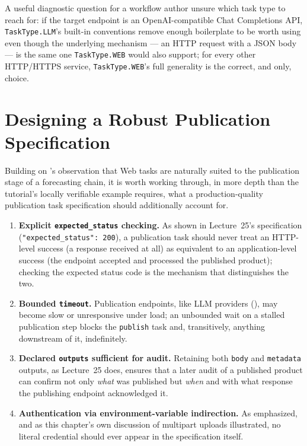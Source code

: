 \begin{practicebox}
A useful diagnostic question for a workflow author unsure which task type to
reach for: if the target endpoint is an OpenAI-compatible Chat Completions
API, \texttt{TaskType.LLM}'s built-in conventions remove enough boilerplate
to be worth using even though the underlying mechanism --- an HTTP request
with a JSON body --- is the same one \texttt{TaskType.WEB} would also
support; for every other HTTP/HTTPS service, \texttt{TaskType.WEB}'s full
generality is the correct, and only, choice.
\end{practicebox}

\section{Designing a Robust Publication Specification}

Building on 's observation that Web tasks are naturally
suited to the publication stage of a forecasting chain, it is worth working
through, in more depth than the tutorial's locally verifiable example
requires, what a production-quality publication task specification should
additionally account for.

\begin{enumerate}[leftmargin=1.8em]
  \item \textbf{Explicit \texttt{expected\_status} checking.} As shown in
    Lecture~25's specification (\texttt{"expected\_status": 200}), a
    publication task should never treat an HTTP-level success (a response
    received at all) as equivalent to an application-level success (the
    endpoint accepted and processed the published product); checking the
    expected status code is the mechanism that distinguishes the two.
  \item \textbf{Bounded \texttt{timeout}.} Publication endpoints, like LLM
    providers (), may become slow or unresponsive under
    load; an unbounded wait on a stalled publication step blocks the
    \texttt{publish} task and, transitively, anything downstream of it,
    indefinitely.
  \item \textbf{Declared \texttt{outputs} sufficient for audit.} Retaining
    both \texttt{body} and \texttt{metadata} outputs, as Lecture~25 does,
    ensures that a later audit of a published product can confirm not only
    \emph{what} was published but \emph{when} and with what response the
    publishing endpoint acknowledged it.
  \item \textbf{Authentication via environment-variable indirection.} As
     emphasized, and as this chapter's own
    discussion of multipart uploads illustrated, no literal credential
    should ever appear in the specification itself.
\end{enumerate}

